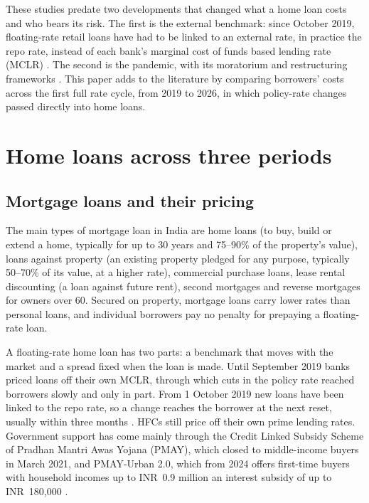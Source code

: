 \documentclass[sn-basic]{sn-jnl}
\newcommand{\INR}{INR~}
\begin{document}
These studies predate two developments that changed what a home loan costs and who bears its risk. The first is the external benchmark: since October 2019, floating-rate retail loans have had to be linked to an external rate, in practice the repo rate, instead of each bank's marginal cost of funds based lending rate (MCLR) \citep{rbi2019eblr}. The second is the pandemic, with its moratorium and restructuring frameworks \citep{paisabazaar2021,rbi2021rf2}. This paper adds to the literature by comparing borrowers' costs across the first full rate cycle, from 2019 to 2026, in which policy-rate changes passed directly into home loans.

\section{Home loans across three periods}\label{sec:eras}

\subsection{Mortgage loans and their pricing}

The main types of mortgage loan in India are home loans (to buy, build or extend a home, typically for up to 30 years and 75--90\% of the property's value), loans against property (an existing property pledged for any purpose, typically 50--70\% of its value, at a higher rate), commercial purchase loans, lease rental discounting (a loan against future rent), second mortgages and reverse mortgages for owners over 60. Secured on property, mortgage loans carry lower rates than personal loans, and individual borrowers pay no penalty for prepaying a floating-rate loan.

A floating-rate home loan has two parts: a benchmark that moves with the market and a spread fixed when the loan is made. Until September 2019 banks priced loans off their own MCLR, through which cuts in the policy rate reached borrowers slowly and only in part. From 1 October 2019 new loans have been linked to the repo rate, so a change reaches the borrower at the next reset, usually within three months \citep{rbi2019eblr}. HFCs still price off their own prime lending rates. Government support has come mainly through the Credit Linked Subsidy Scheme of Pradhan Mantri Awas Yojana (PMAY), which closed to middle-income buyers in March 2021, and PMAY-Urban 2.0, which from 2024 offers first-time buyers with household incomes up to \INR 0.9 million an interest subsidy of up to \INR 180,000 \citep{icicihfc2024}.
\end{document}
